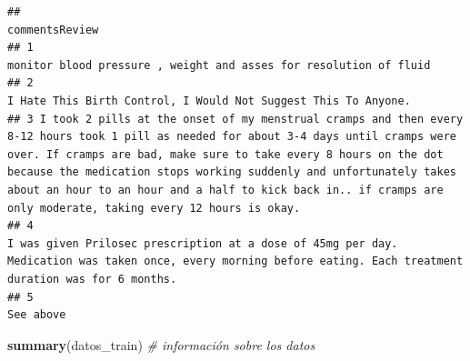 \documentclass[spanish,]{article}
\newenvironment{Shaded}{\begin{snugshade}}{\end{snugshade}}
\newcommand{\KeywordTok}[1]{\textcolor[rgb]{0.13,0.29,0.53}{\textbf{#1}}}
\newcommand{\CommentTok}[1]{\textcolor[rgb]{0.56,0.35,0.01}{\textit{#1}}}
\newcommand{\NormalTok}[1]{#1}
\begin{document}
\begin{verbatim}
##                                                                                                                                                                                                                                                                                                                                                                                        commentsReview
## 1                                                                                                                                                                                                                                                                                                                                   monitor blood pressure , weight and asses for resolution of fluid
## 2                                                                                                                                                                                                                                                                                                                                      I Hate This Birth Control, I Would Not Suggest This To Anyone.
## 3 I took 2 pills at the onset of my menstrual cramps and then every 8-12 hours took 1 pill as needed for about 3-4 days until cramps were over. If cramps are bad, make sure to take every 8 hours on the dot because the medication stops working suddenly and unfortunately takes about an hour to an hour and a half to kick back in.. if cramps are only moderate, taking every 12 hours is okay.
## 4                                                                                                                                                                                                                                      I was given Prilosec prescription at a dose of 45mg per day. Medication was taken once, every morning before eating. Each treatment duration was for 6 months.
## 5                                                                                                                                                                                                                                                                                                                                                                                           See above
\end{verbatim}

\begin{Shaded}
\begin{Highlighting}[]
\KeywordTok{summary}\NormalTok{(datos_train) }\CommentTok{# información sobre los datos}
\end{Highlighting}
\end{Shaded}
\end{document}
